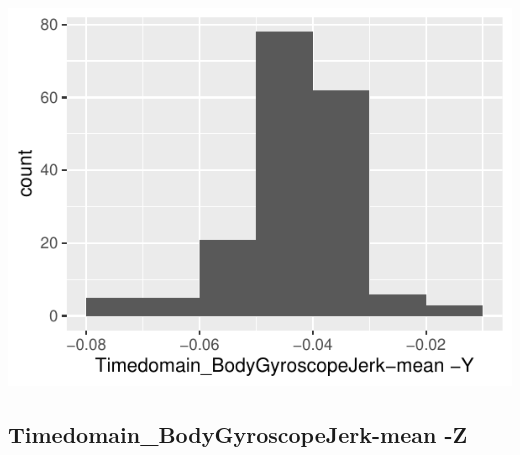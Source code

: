 \documentclass[
]{article}
\begin{document}
\begin{minipage}{0.25 \textwidth}

\includegraphics{codebook_tidydatasub_files/figure-latex/Var-28-Timedomain-BodyGyroscopeJerk-mean--Y-1.pdf}

\end{minipage}

\noindent\makebox[\linewidth]{\rule{\textwidth}{0.4pt}}

\hypertarget{timedomain_bodygyroscopejerk-mean--z}{%
\subsection{Timedomain\_BodyGyroscopeJerk-mean
-Z}\label{timedomain_bodygyroscopejerk-mean--z}}
\end{document}

